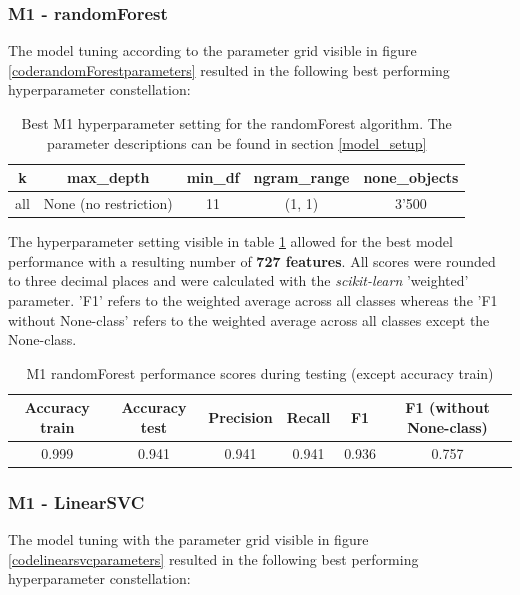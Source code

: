 \subsubsection*{M1 - randomForest}
The model tuning according to the parameter grid visible in figure \ref{coderandomForestparameters} resulted in the following best performing hyperparameter constellation:

\begin{table}[h!]
\begin{center}
\caption{Best M1 hyperparameter setting for the randomForest algorithm. The parameter descriptions can be found in section \ref{model_setup}}\vspace{1ex}
\label{tab:m1_randomForest_bestParams}
\begin{tabular}{ccccc}\hline
k & max\_depth & min\_df & ngram\_range & none\_objects \\ \hline
all & None (no restriction) & 11 & (1, 1) & 3'500 \\ \hline
\end{tabular}
\end{center}
\end{table}

The hyperparameter setting visible in table \ref{tab:m1_randomForest_bestParams} allowed for the best model performance with a resulting number of \textbf{727 features}. All scores were rounded to three decimal places and were calculated with the \textit{scikit-learn} 'weighted' parameter. 'F1' refers to the weighted average across all classes whereas the 'F1 without None-class' refers to the weighted average across all classes except the None-class.

\begin{table}[h!]
\begin{center}
\caption{M1 randomForest performance scores during testing (except accuracy train)}\vspace{1ex}
\label{tab:m1_randomForest_bestscores}
\begin{tabular}{cccccc}\hline
Accuracy train & Accuracy test & Precision & Recall & F1 & F1 (without None-class)\\ \hline
0.999 & 0.941 & 0.941 & 0.941 & 0.936 & 0.757 \\ \hline
\end{tabular}
\end{center}
\end{table}

\subsubsection*{M1 - LinearSVC}
The model tuning with the parameter grid visible in figure \ref{codelinearsvcparameters} resulted in the following best performing hyperparameter constellation:

